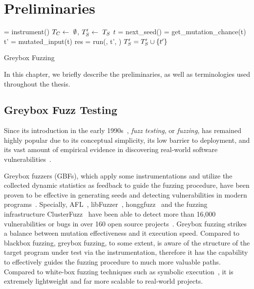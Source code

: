 \chapter{Preliminaries} \label{ch:preliminaries}

\begin{algorithm}[t]
 \small
{}
	\Prog = instrument(\ProgO) 
	$T_{C} \leftarrow~\emptyset$, $T^{\prime}_{S} \leftarrow~T_{S}$\; 
	 {
		$t$ = next\_seed(\FinalSeeds) 
		\mutChance = get\_mutation\_chance(t)  \label{line:algo:energy}
		 {
			t' = mutated\_input(t)  
			res = run(\Prog, t', \Ncal)
			 {\label{line:algo:new_cov}
				$T^{\prime}_{S} = T^{\prime}_{S}\cup\{t'\}$  \label{line:algo:triage_end}
			}
		}
	}
	\caption{Greybox Fuzzing}\label{algo:gbf}
\end{algorithm}

In this chapter, we briefly describe the preliminaries, as well as terminologies used throughout the thesis.

\section{Greybox Fuzz Testing}\label{sec:intro-gbf}
Since its introduction in the early 1990s~\cite{fuzzing1990}, \emph{fuzz testing}, or \emph{fuzzing}, has remained highly popular due to its conceptual simplicity, its low barrier to deployment, and its vast amount of empirical evidence in discovering real-world software vulnerabilities~\cite{fuzz_survey}.

Greybox fuzzers (GBFs), which apply some instrumentations and utilize the collected dynamic statistics as feedback to guide the fuzzing procedure, have been proven to be effective in generating seeds and detecting vulnerabilities in modern programs~\cite{fuzz_survey}. Specially, AFL~\cite{afl}, libFuzzer~\cite{libfuzzer}, honggfuzz~\cite{honggfuzz} and the fuzzing infrastructure ClusterFuzz~\cite{clusterfuzz} have been able to detect more than 16,000 vulnerabilities or bugs in over 160 open source projects~\cite{afl,clusterfuzz}. Greybox fuzzing strikes a balance between mutation effectiveness and it execution speed. Compared to blackbox fuzzing, greybox fuzzing, to some extent, is aware of the structure of the target program under test via the instrumentation, therefore it has the capability to effectively guides the fuzzing procedure to much more valuable paths. Compared to white-box fuzzing techniques such as symbolic execution~\cite{dart,klee}, it is extremely lightweight and far more scalable to real-world projects.


